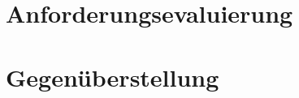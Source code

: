 \section{Anforderungsevaluierung}
\label{sec:anforderunsevaluierung}

\section{Gegenüberstellung}
\label{sec:gegenueberstellung}
